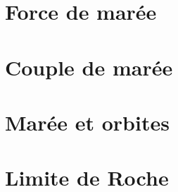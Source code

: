 \documentclass[a4paper,DIV16,10pt]{scrartcl}
\begin{document}
 \inidoc



\newpage
\section{Force de marée}


\newpage
\section{Couple de marée}


\newpage
\section{Marée et orbites}


%

\newpage
\section{Limite de Roche}


%

%

%
\end{document}
